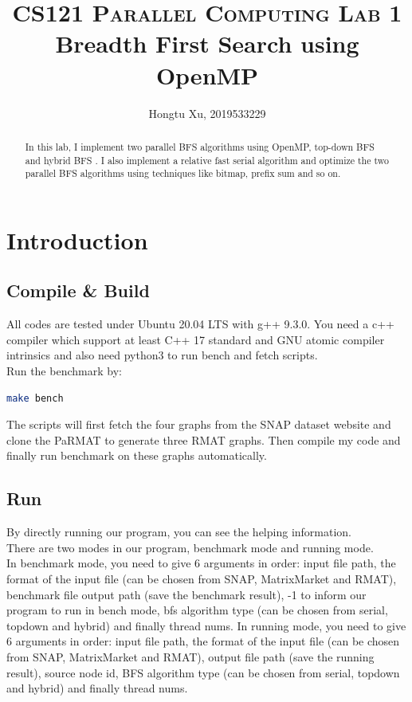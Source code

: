 \documentclass[10pt,twocolumn,letterpaper]{article}
\title{
		\usefont{OT1}{bch}{b}{n}
		\normalfont \normalsize \textsc{CS121 Parallel Computing Lab 1} \\ [10pt]
		\huge Breadth First Search using OpenMP \\
}
\author[]{Hongtu Xu, 2019533229}
\affil[]{xuht1@shanghaitech.edu.cn}
\begin{document}
\maketitle

\begin{abstract}

In this lab, I implement two parallel BFS algorithms using OpenMP, top-down BFS and hybrid BFS \cite{beamer2012direction}. I also implement a relative fast serial algorithm and optimize the two parallel BFS algorithms using techniques like bitmap, prefix sum and so on.
\end{abstract} 

\section{Introduction}
\subsection{Compile \& Build}

All codes are tested under Ubuntu 20.04 LTS with g++ 9.3.0. You need a c++ compiler which support at least C++ 17 standard and GNU atomic compiler intrinsics and also need python3 to run bench and fetch scripts.\\
Run the benchmark by:
\begin{lstlisting}[language=bash]
make bench
\end{lstlisting}
The scripts will first fetch the four graphs from the SNAP dataset website and clone the PaRMAT \cite{wsvr} to generate three RMAT graphs. Then compile my code and finally run benchmark on these graphs automatically.

\subsection{Run}

By directly running our program, you can see the helping information. \\
There are two modes in our program, benchmark mode and running mode. \\
In benchmark mode, you need to give 6 arguments in order: input file path, the format of the input file (can be chosen from SNAP, MatrixMarket and RMAT), benchmark file output path (save the benchmark result), -1 to inform our program to run in bench mode, bfs algorithm type (can be chosen from serial, topdown and hybrid) and finally thread nums.
In running mode, you need to give 6 arguments in order: input file path, the format of the input file (can be chosen from SNAP, MatrixMarket and RMAT), output file path (save the running result), source node id, BFS algorithm type (can be chosen from serial, topdown and hybrid) and finally thread nums.
\end{document}

